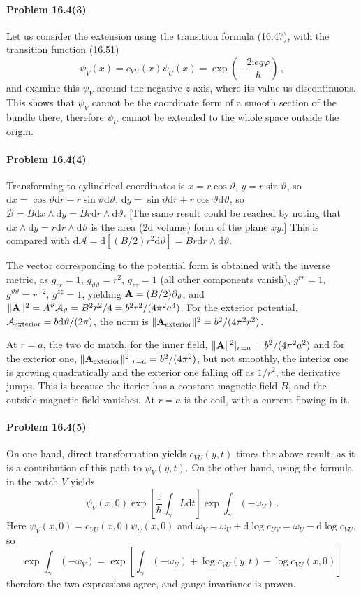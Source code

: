 \documentclass[a4paper,12pt]{article}
\def\d{\mathrm{d}}
\def\imagi{\mathrm{i}}
\newcommand{\problem}[1]{\paragraph{Problem #1}}
\begin{document}

\problem{16.4(3)} Let us consider the extension using the transition formula (16.47), with the transition function (16.51)
\[
 \psi_V(x) = c_{VU}(x)\psi_U(x) = \exp\left(-\frac{2\imagi e q\varphi}{\hbar}\right)\,,
\]
and examine this $\psi_V$ around the negative $z$ axis, where its value us discontinuous. This shows that $\psi_V$ cannot be the coordinate form of a smooth section of the bundle there, therefore $\psi_U$ cannot be extended to the whole space outside the origin.


\problem{16.4(4)} Transforming to cylindrical coordinates is $x=r\cos\vartheta$, $y=r\sin\vartheta$, so $\d x = \cos\vartheta \d r-r\sin\vartheta \d\vartheta$, $\d y = \sin\vartheta \d r + r\cos\vartheta\d\vartheta$, so $\mathcal{B} = B \d x \wedge \d y = B r \d r \wedge \d\vartheta$. [The same result could be reached by noting that $\d x \wedge \d y = r \d r\wedge \d\vartheta$ is the area (2d volume) form of the plane $xy$.] This is compared with $\d \mathcal{A} = \d [(B/2) r^2 \d\vartheta] = B r \d r \wedge\d\vartheta$.

The vector corresponding to the potential form is obtained with the inverse metric, as $g_{rr} = 1$, $g_{\vartheta\vartheta}=r^2$, $g_{zz}=1$ (all other components vanish), $g^{rr}=1$, $g^{\vartheta\vartheta}=r^{-2}$, $g^{zz}=1$, yielding ${\bf A} = (B/2) \partial_\vartheta$, and $\|{\bf A}\|^2=A^\vartheta \mathcal{A}_\vartheta  = B^2 r^2/4 = b^2r^2/(4\pi^2 a^4)$. For the exterior potential, $\mathcal{A}_{\rm exterior} = b \d\vartheta/(2\pi)$, the norm is $\|{\bf A}_{\rm exterior}\|^2 = b^2/(4\pi^2 r^2)$.

At $r=a$, the two do match, for the inner field, $\|{\bf A}\|^2|_{r=a} = b^2/(4\pi^2 a^2)$ and for the exterior one, $\|{\bf A}_{\rm exterior}\|^2|_{r=a}=b^2/(4\pi^2)$, but not smoothly, the interior one is growing quadratically and the exterior one falling off as $1/r^2$, the derivative jumps. This is because the iterior has a constant magnetic field $B$, and the outside magnetic field vanishes. At $r=a$ is the coil, with a current flowing in it.


\problem{16.4(5)} On one hand, direct transformation yields
$c_{VU}(y, t)$ times the above result, as it is a contribution of this path to $\psi_V(y, t)$. On the other hand, using the formula in the patch $V$ yields
\[
 \psi_V(x, 0)\exp\left[\frac{\imagi}{\hbar}\int_\gamma L\d t\right] \exp\int_\gamma(-\omega_V)\,.
\]
Here $\psi_V(x, 0)=c_{VU}(x, 0) \psi_{U}(x, 0)$ and $\omega_V = \omega_U + \d\log c_{UV} = \omega_U -\d\log c_{VU}$, so
\[
 \exp\int_\gamma (-\omega_V) = \exp\left[\int_\gamma (-\omega_U) +\log c_{VU}(y, t) - \log c_{VU}(x, 0)\right]
\]
therefore the two expressions agree, and gauge invariance is proven.
\end{document}
